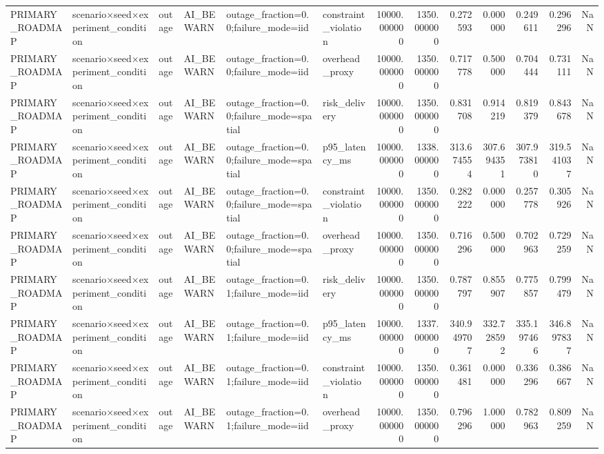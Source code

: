 \begin{tabular}{llllllrrrrrrr}
PRIMARY\_ROADMAP & scenario×seed×experiment\_condition & outage & AI\_BEWARN & outage\_fraction=0.0;failure\_mode=iid & constraint\_violation & 10000.000000 & 1350.000000 & 0.272593 & 0.000000 & 0.249611 & 0.296296 & NaN \\
PRIMARY\_ROADMAP & scenario×seed×experiment\_condition & outage & AI\_BEWARN & outage\_fraction=0.0;failure\_mode=iid & overhead\_proxy & 10000.000000 & 1350.000000 & 0.717778 & 0.500000 & 0.704444 & 0.731111 & NaN \\
PRIMARY\_ROADMAP & scenario×seed×experiment\_condition & outage & AI\_BEWARN & outage\_fraction=0.0;failure\_mode=spatial & risk\_delivery & 10000.000000 & 1350.000000 & 0.831708 & 0.914219 & 0.819379 & 0.843678 & NaN \\
PRIMARY\_ROADMAP & scenario×seed×experiment\_condition & outage & AI\_BEWARN & outage\_fraction=0.0;failure\_mode=spatial & p95\_latency\_ms & 10000.000000 & 1338.000000 & 313.674554 & 307.694351 & 307.973810 & 319.541037 & NaN \\
PRIMARY\_ROADMAP & scenario×seed×experiment\_condition & outage & AI\_BEWARN & outage\_fraction=0.0;failure\_mode=spatial & constraint\_violation & 10000.000000 & 1350.000000 & 0.282222 & 0.000000 & 0.257778 & 0.305926 & NaN \\
PRIMARY\_ROADMAP & scenario×seed×experiment\_condition & outage & AI\_BEWARN & outage\_fraction=0.0;failure\_mode=spatial & overhead\_proxy & 10000.000000 & 1350.000000 & 0.716296 & 0.500000 & 0.702963 & 0.729259 & NaN \\
PRIMARY\_ROADMAP & scenario×seed×experiment\_condition & outage & AI\_BEWARN & outage\_fraction=0.1;failure\_mode=iid & risk\_delivery & 10000.000000 & 1350.000000 & 0.787797 & 0.855907 & 0.775857 & 0.799479 & NaN \\
PRIMARY\_ROADMAP & scenario×seed×experiment\_condition & outage & AI\_BEWARN & outage\_fraction=0.1;failure\_mode=iid & p95\_latency\_ms & 10000.000000 & 1337.000000 & 340.949707 & 332.728592 & 335.197466 & 346.897837 & NaN \\
PRIMARY\_ROADMAP & scenario×seed×experiment\_condition & outage & AI\_BEWARN & outage\_fraction=0.1;failure\_mode=iid & constraint\_violation & 10000.000000 & 1350.000000 & 0.361481 & 0.000000 & 0.336296 & 0.386667 & NaN \\
PRIMARY\_ROADMAP & scenario×seed×experiment\_condition & outage & AI\_BEWARN & outage\_fraction=0.1;failure\_mode=iid & overhead\_proxy & 10000.000000 & 1350.000000 & 0.796296 & 1.000000 & 0.782963 & 0.809259 & NaN \\

\end{tabular}
